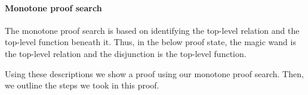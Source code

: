 \documentclass[thesis.tex]{subfiles}
\begin{document}
\paragraph{Monotone proof search}
The monotone proof search is based on identifying the top-level relation and the top-level function beneath it. Thus, in the below proof state, the magic wand is the top-level relation and the disjunction is the top-level function.
\begin{center}
\end{center}
Using these descriptions we show a proof using our monotone proof search. Then, we outline the steps we took in this proof.
\end{document}
